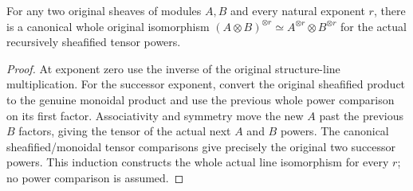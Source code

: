 \begin{lemma}
\label{lem:fc-original-bundle-tensor-power-tensor}
\leanok
For any two original sheaves of modules $A,B$ and every natural exponent
$r$, there is a canonical whole original isomorphism
$(A\otimes B)^{\otimes r}\simeq A^{\otimes r}\otimes B^{\otimes r}$
for the actual recursively sheafified tensor powers.
\end{lemma}
\begin{proof}
At exponent zero use the inverse of the original structure-line
multiplication. For the successor exponent, convert the original
sheafified product to the genuine monoidal product and use the previous
whole power comparison on its first factor. Associativity and symmetry
move the new $A$ past the previous $B$ factors, giving the tensor of the
actual next $A$ and $B$ powers. The canonical sheafified/monoidal tensor
comparisons give precisely the original two successor powers. This
induction constructs the whole actual line isomorphism for every $r$;
no power comparison is assumed.
\end{proof}
